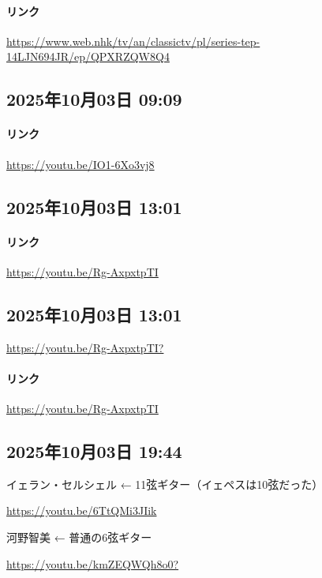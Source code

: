 \paragraph{リンク}
\url{https://www.web.nhk/tv/an/classictv/pl/series-tep-14LJN694JR/ep/QPXRZQW8Q4}

\subsection*{2025年10月03日 09:09}

\paragraph{リンク}
\url{https://youtu.be/IO1-6Xo3vj8}

\subsection*{2025年10月03日 13:01}

\paragraph{リンク}
\url{https://youtu.be/Rg-AxpxtpTI}

\subsection*{2025年10月03日 13:01}

\url{https://youtu.be/Rg-AxpxtpTI?}

\paragraph{リンク}
\url{https://youtu.be/Rg-AxpxtpTI}

\subsection*{2025年10月03日 19:44}

イェラン・セルシェル  ← 11弦ギター（イェペスは10弦だった）

\url{https://youtu.be/6TtQMi3JIik}

河野智美 ← 普通の6弦ギター

\url{https://youtu.be/kmZEQWQh8o0?}


